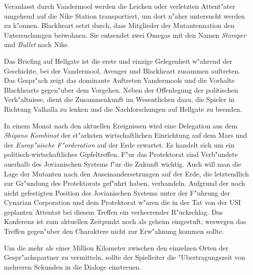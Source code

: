 Veranlasst durch Vandermool werden die Leichen oder verletzten Attent"ater umgehend auf die Nike Station transportiert, um dort n"aher untersucht werden zu k"onnen. Blackheart setzt durch, dass Mitglieder der Mutantennation den Untersuchungen beiwohnen. Sie entsendet zwei Omegas mit den Namen \emph{Stomper} und \emph{Bullet} nach Nike.

\begin{remarks}
	Das Briefing auf Hellgate ist die erste und einzige Gelegenheit w"ahrend der Geschichte, bei der Vandermool, Avenger und Blackheart zusammen auftreten. Das Gespr"ach zeigt das dominante Auftreten Vandermools und die Vorhalte Blackhearts gegen"uber dem Vorgehen. Neben der Offenlegung der politischen Verh"altnisse, dient die Zusammenkunft im Wesentlichen dazu, die Spieler in Richtung Valhalla zu lenken und die Nachforschungen auf Hellgate zu beenden.

	In einem Monat nach den aktuellen Ereignissen wird eine Delegation aus dem \emph{Shigano Kombinat} der st"arksten wirtschaftlichen Einrichtung auf dem Mars und der \emph{Europ"aische F"orderation} auf der Erde erwartet. Es handelt sich um ein politisch-wirtschaftliches Gipfeltreffen. F"ur das Protektorat sind Verb"undete au\3erhalb des Jovianischen Systems f"ur die Zukunft wichtig. Auch will man die Lage der Mutanten nach den Auseinandersetzungen auf der Erde, die letztendlich zur Gr"undung des Protektorats gef"uhrt haben, verhandeln. Aufgrund der noch nicht gefestigten Position des Jovianischen Systems unter der F"uhrung der Cynarian Corporation und dem Protektorat w"aren die in der Tat von der USI geplanten Attentat bei diesem Treffen ein verheerender R"uckschlag. Das Konferenz ist zum aktuellen Zeitpunkt noch als geheim eingestuft, weswegen das Treffen gegen"uber den Charaktere nicht zur Erw"ahnung kommen sollte.

	Um die mehr als einer Million Kilometer zwischen den einzelnen Orten der Gespr"achspartner zu vermitteln, sollte der Spielleiter die "Ubertragungszeit von mehreren Sekunden in die Dialoge einstreuen.
\end{remarks}
